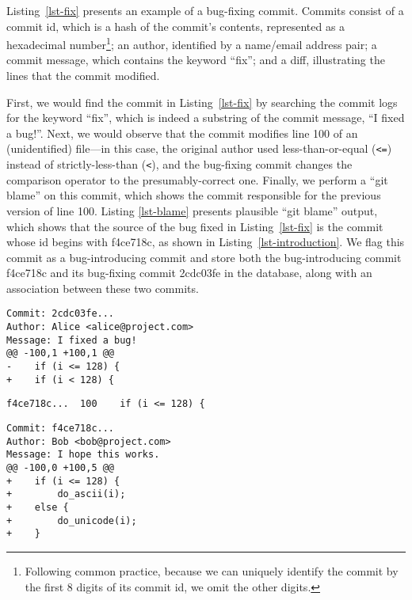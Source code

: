 Listing~\ref{lst-fix} presents an example of a bug-fixing commit. Commits
consist of a commit id, which is a hash of the commit's contents, represented as
a hexadecimal number\footnote{Following common practice, because we can uniquely
  identify the commit by the first 8 digits of its commit id, we omit the other
  digits.}; an author, identified by a name/email address pair; a commit
message, which contains the keyword ``fix''; and a diff, illustrating the lines
that the commit modified.

First, we would find the commit in Listing~\ref{lst-fix} by searching the commit
logs for the keyword ``fix'', which is indeed a substring of the commit message,
``I fixed a bug!''.  Next, we would observe that the commit modifies line 100 of
an (unidentified) file---in this case, the original author used
less-than-or-equal (\verb+<=+) instead of strictly-less-than (\verb+<+), and the
bug-fixing commit changes the comparison operator to the presumably-correct one.
Finally, we perform a ``git blame'' on this commit, which shows the commit
responsible for the previous version of line 100. Listing \ref{lst-blame}
presents plausible ``git blame'' output, which shows that the source of the bug
fixed in Listing~\ref{lst-fix} is the commit whose id begins with f4ce718c, as
shown in Listing~\ref{lst-introduction}. We flag this commit as a
bug-introducing commit and store both the bug-introducing commit f4ce718c and
its bug-fixing commit 2cdc03fe in the database, along with an association
between these two commits.

\begin{lstlisting}[caption=An example bug-fixing commit, label=lst-fix,
                   frame=single]
Commit: 2cdc03fe...
Author: Alice <alice@project.com>
Message: I fixed a bug!
@@ -100,1 +100,1 @@
-    if (i <= 128) {
+    if (i < 128) {
\end{lstlisting}

\begin{lstlisting}[caption={\tt git blame} output for the bug-fixing commit,
                   label=lst-blame, frame=single]
f4ce718c...  100    if (i <= 128) {
\end{lstlisting}

\begin{lstlisting}[caption=Associated bug-introducing commit for the example,
                   label=lst-introduction, frame=single]
Commit: f4ce718c...
Author: Bob <bob@project.com>
Message: I hope this works.
@@ -100,0 +100,5 @@
+    if (i <= 128) {
+        do_ascii(i);
+    else {
+        do_unicode(i);
+    }
\end{lstlisting}

